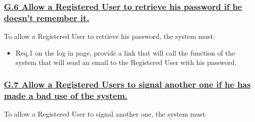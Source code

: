 \documentclass{report}
\begin{document}
			\subsubsection{\lbrack \hyperref[sec:g6]{G.6 Allow a Registered User to retrieve his password if he doesn't remember it.}\rbrack}\label{sec:frs6}
			To allow a Registered User to retrieve his password, the system must:

				\begin{itemize}
					\item \lbrack Req.1\rbrack \label{sec:fr1_g6} on the log in page, provide a link that will call the function of the system that will send an email to the Registered User with his password.
				\end{itemize}

			\subsubsection{\lbrack \hyperref[sec:g7]{G.7 Allow a Registered Users to signal another one if he has made a bad use of the system.}\rbrack}\label{sec:frs7}
			To allow a Registered User to signal another one, the system must:
\end{document}
